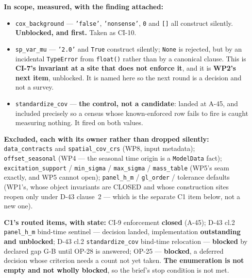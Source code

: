 \documentclass[
  10pt,
]{article}
\begin{document}
\textbf{In scope, measured, with the finding attached:}
\begin{itemize}
\item \texttt{cox\_background} --- \texttt{'false'}, \texttt{'nonsense'}, \texttt{0} and \texttt{[]} all construct silently. \textbf{Unblocked, and first.} Taken as CI-10.
\item \texttt{sp\_var\_mu} --- \texttt{'2.0'} and \texttt{True} construct silently; \texttt{None} is rejected, but by an incidental \texttt{TypeError} from \texttt{float()} rather than by a canonical clause. This is \textbf{CI-7's invariant at a site that does not enforce it}, and it is \textbf{WP2's next item}, unblocked. It is named here so the next round is a decision and not a survey.
\item \texttt{standardize\_cov} --- \textbf{the control, not a candidate}: landed at A-45, and included precisely so a census whose known-enforced row fails to fire is caught measuring nothing. It fired on both values.
\end{itemize}

\textbf{Excluded, each with its owner rather than dropped silently:} \texttt{data\_contracts} and \texttt{spatial\_cov\_crs} (WP8, input metadata); \texttt{offset\_seasonal} (WP4 --- the seasonal time origin is a \texttt{ModelData} fact); \texttt{excitation\_support} / \texttt{min\_sigma} / \texttt{max\_sigma} / \texttt{mass\_table} (WP5's seam exactly, and WP5 cannot open); \texttt{panel\_h\_m} / \texttt{gl\_order} / tolerance defaults (WP1's, whose object invariants are CLOSED and whose construction sites reopen only under D-43 clause~2 --- which is the separate C1 item below, not a new one).

\textbf{C1's routed items, with state:} CI-9 enforcement \textbf{closed} (A-45); D-43 cl.2 \texttt{panel\_h\_m} bind-time sentinel --- decision landed, implementation \textbf{outstanding and unblocked}; D-43 cl.2 \texttt{standardize\_cov} bind-time relocation --- \textbf{blocked} by declared gap G-B until OP-28 is answered; OP-25 --- \textbf{blocked}, a deferred decision whose criterion needs a count not yet taken. \textbf{The enumeration is not empty and not wholly blocked}, so the brief's stop condition is not met.
\end{document}
